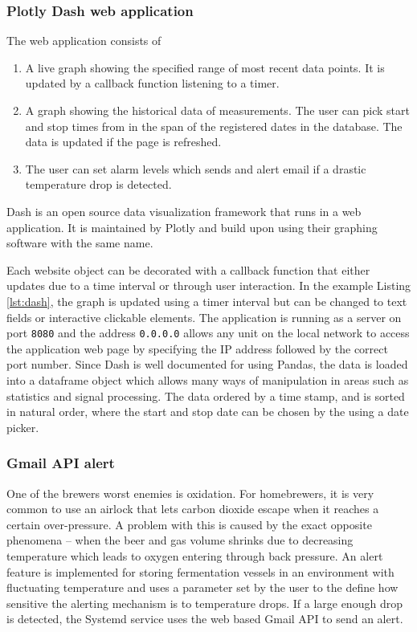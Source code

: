 \subsubsection{Plotly Dash web application}%
\label{ssub:plotly_dash_web_application}
The web application consists of
\begin{enumerate}
  \item A live graph showing the specified range of most recent data points. It is updated by a callback function listening to a timer.
  \item A graph showing the historical data of measurements. The user can pick start and stop times from in the span of the registered dates in the database. The data is updated if the page is refreshed.
  \item The user can set alarm levels which sends and alert email if a drastic temperature drop is detected.
\end{enumerate}

Dash is an open source data visualization framework that runs in a web application. It is maintained by Plotly and build upon using their graphing software with the same name.



Each website object can be decorated with a callback function that either updates due to a time interval or through user interaction. In the example Listing \ref{lst:dash}, the graph is updated using a timer interval but can be changed to text fields or interactive clickable elements. The application is running as a server on port \verb|8080| and the address \verb|0.0.0.0| allows any unit on the local network to access the application web page by specifying the IP address followed by the correct port number.  Since Dash is well documented for using Pandas, the data is loaded into a dataframe object which allows many ways of manipulation in areas such as statistics and signal processing. The data ordered by a time stamp, and is sorted in natural order, where the start and stop date can be chosen by the using a date picker.

\subsubsection{Gmail API alert}%
\label{ssub:gmail_api_alert}
One of the brewers worst enemies is oxidation. For homebrewers, it is very common to use an airlock that lets carbon dioxide escape when it reaches a certain over-pressure. A problem with this is caused by the exact opposite phenomena -- when the beer and gas volume shrinks due to decreasing temperature which leads to oxygen entering through back pressure. An alert feature is implemented for storing fermentation vessels in an environment with fluctuating temperature and uses a parameter set by the user to the define how sensitive the alerting mechanism is to temperature drops. If a large enough drop is detected, the Systemd service uses the web based Gmail API to send an alert.
